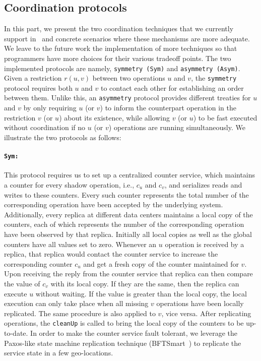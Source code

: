 \subsection{Coordination protocols}
\label{ch:por:sect:coordination}
In this part, we present the two coordination techniques that
we currently support in \coordtool\ and concrete
scenarios where these mechanisms are more adequate. We leave to
the future work the implementation of more techniques so that
programmers have more choices for their various tradeoff points. 
The two implemented protocols are namely, {\tt symmetry (Sym)} and {\tt asymmetry (Asym)}.
Given a restriction $r(u, v)$ between two operations $u$ and $v$, the 
{\tt symmetry} protocol requires both $u$ and $v$ to contact each other
for establishing an order between them. Unlike this, an {\tt asymmetry} protocol
provides different treaties for $u$ and $v$ by
only requiring $u$ (or $v$) to inform the counterpart operation in the restriction $v$ (or $u$) 
about its existence, while allowing $v$ (or $u$) to be fast executed without coordination 
if no $u$ (or $v$) operations are running simultaneously. We illustrate the two protocols as follows:

\paragraph{{\tt Sym:}} This protocol requires us to set up a centralized counter service, 
which maintains a counter for every shadow operation, i.e., $c_{u}$ and $c_{v}$,
and serializes reads and writes to these counters. Every such counter represents the total number of the corresponding
operation have been accepted by the underlying system. Additionally, every replica at different
data centers maintains a local copy of the counters, each of which represents the number of the corresponding
operation have been observed by that replica. Initially all local copies as well as the global counters have 
all values set to zero. Whenever an $u$ operation is received by a replica, 
that replica would contact the counter service to increase the
corresponding counter $c_{u}$ and get a fresh copy of the counter maintained
for $v$. Upon receiving the reply from the counter service
that replica can then compare the value of $c_{v}$ with its local copy.
If they are the same, then the replica can execute $u$ without waiting. If the value is greater than
the local copy, the local execution can only take place when all missing $v$ operations have been locally replicated.
The same procedure is also applied to $v$, vice versa. After replicating operations, 
the {\tt cleanUp} is called to bring the local copy of the counters to be up-to-date.
In order to make the counter service fault tolerant, we leverage the Paxos-like state machine replication technique (BFTSmart~\cite{Bessani2014SMR}) to 
replicate the service state in a few geo-locations.


